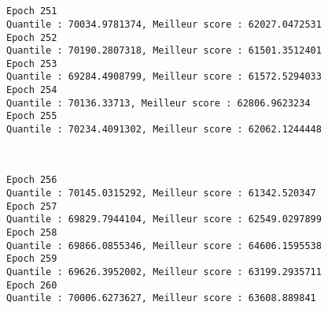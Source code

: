 \documentclass[11pt]{article}
\begin{document}
    \begin{center}
    \end{center}
    { \hspace*{\fill} \\}
    
    \begin{center}
    \end{center}
    { \hspace*{\fill} \\}
    
    \begin{Verbatim}[commandchars=\\\{\}]
Epoch 251
Quantile : 70034.9781374, Meilleur score : 62027.0472531
Epoch 252
Quantile : 70190.2807318, Meilleur score : 61501.3512401
Epoch 253
Quantile : 69284.4908799, Meilleur score : 61572.5294033
Epoch 254
Quantile : 70136.33713, Meilleur score : 62806.9623234
Epoch 255
Quantile : 70234.4091302, Meilleur score : 62062.1244448

    \end{Verbatim}

    \begin{center}
    \end{center}
    { \hspace*{\fill} \\}
    
    \begin{Verbatim}[commandchars=\\\{\}]
Epoch 256
Quantile : 70145.0315292, Meilleur score : 61342.520347
Epoch 257
Quantile : 69829.7944104, Meilleur score : 62549.0297899
Epoch 258
Quantile : 69866.0855346, Meilleur score : 64606.1595538
Epoch 259
Quantile : 69626.3952002, Meilleur score : 63199.2935711
Epoch 260
Quantile : 70006.6273627, Meilleur score : 63608.889841

    \end{Verbatim}

    \begin{center}
    \end{center}
    { \hspace*{\fill} \\}
    
    \begin{center}
    \end{center}
    { \hspace*{\fill} \\}
    
\end{document}
